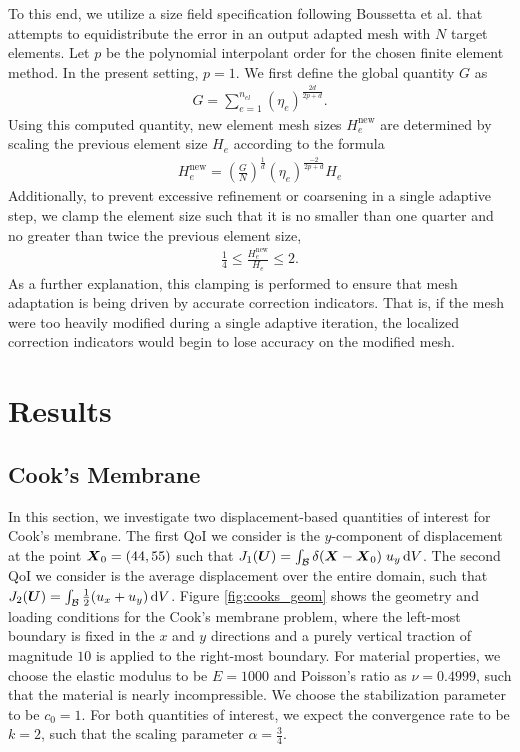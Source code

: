To this end, we utilize a size field specification following Boussetta et al.
\cite{boussetta2006adaptive} that attempts to equidistribute the error in an
output adapted mesh with $N$ target elements. Let $p$ be the polynomial
interpolant order for the chosen finite element method. In the present
setting, $p=1$. We first define the global quantity $G$ as
%
\begin{gather}
G = \sum_{e=1}^{n_{el}} ( \eta_e ) ^{\frac{2d}{2p+d}}.
\label{eq:mech_global_size_quantity}
\end{gather}
%
Using this computed quantity, new element mesh sizes $H_e^{\text{new}}$ are
determined by scaling the previous element size $H_e$ according to the
formula
%
\begin{gather}
H_e^{\text{new}} = \left( \frac{G}{N} \right)^{\frac{1}{d}}
( \eta_e )^{\frac{-2}{2p + d}} H_e
\label{eq:mech_size_field}
\end{gather}
%
Additionally, to prevent excessive refinement or coarsening in a single
adaptive step, we clamp the element size such that it is no smaller than
one quarter and no greater than twice the previous element size,
%
\begin{gather}
\frac14 \leq \frac{H_e^{\text{new}}}{H_e} \leq 2.
\label{eq:mech_size_clamping}
\end{gather}
%
As a further explanation, this clamping is performed to ensure that mesh
adaptation is being driven by accurate correction indicators. That is,
if the mesh were too heavily modified during a single adaptive iteration,
the localized correction indicators would begin to lose accuracy on the
modified mesh.

\section{Results}

\subsection{Cook's Membrane}

In this section, we investigate two displacement-based quantities of
interest for Cook's membrane. The first QoI we consider is
the $y$-component of displacement at the point $\boldsymbol{X}_0 = (44,55)$ such
that $J_1(\boldsymbol{U}) = \int_{\mathcal{B}} \delta(\boldsymbol{X} - \boldsymbol{X}_0) \; u_y \, \text{d} V$. 
The second QoI we consider is the average displacement
over the entire domain, such that $J_2(\boldsymbol{U}) = \int_{\mathcal{B}} \frac12 (u_x + u_y)
\, \text{d} V$. Figure \ref{fig:cooks_geom} shows the geometry and loading
conditions for the Cook's membrane problem, where the left-most boundary
is fixed in the $x$ and $y$ directions and a purely vertical traction of
magnitude $10$ is applied to the right-most boundary. For material
properties, we choose the elastic modulus to be $E=1000$ and Poisson's
ratio as $\nu = 0.4999$, such that the material is nearly incompressible.
We choose the stabilization parameter to be $c_0 = 1$. For both
quantities of interest, we expect the convergence rate to be $k = 2$, such
that the scaling parameter $\alpha = \frac34$.

